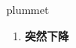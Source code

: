 
\begin{frame}
{\huge plummet}
\begin{center}
\begin{enumerate}\Large
  \item \textbf{突然下降}
\end{enumerate}
\end{center}
\end{frame}
